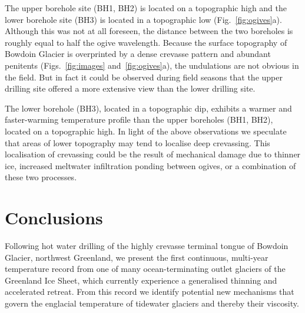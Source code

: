 \documentclass[utf8]{article}
\begin{document}
    The upper borehole site (BH1, BH2) is located on a topographic high and the
    lower borehole site (BH3) is located in a topographic low
    (Fig.~\ref{fig:ogives}a). Although this
    was not at all foreseen, the distance between the two boreholes is roughly
    equal to half the ogive wavelength. Because the surface topography of
    Bowdoin Glacier is overprinted by a dense crevasse pattern and abundant
    penitents (Figs.~\ref{fig:images} and~\ref{fig:ogives}a), the undulations
    are not obvious in the field. But in fact it
    could be observed during field seasons that the upper drilling site offered
    a more extensive view than the lower drilling site.

    The lower borehole (BH3), located in a topographic dip, exhibits a warmer
    and faster-warming temperature profile than the upper boreholes (BH1, BH2),
    located on a topographic high. In light of the above observations we
    speculate that areas of lower topography may tend to localise deep
    crevassing. This localisation of crevassing
    could be the result of mechanical damage due to thinner ice, increased
    meltwater infiltration ponding between ogives, or a combination of these
    two processes.


\section{Conclusions}

    Following hot water drilling of the highly crevasse terminal tongue of
    Bowdoin Glacier, northwest Greenland, we present the first continuous,
    multi-year temperature record from one of many ocean-terminating outlet
    glaciers of the Greenland Ice Sheet, which currently experience a
    generalised thinning and accelerated retreat. From this record we identify
    potential new mechanisms that govern the englacial temperature of tidewater
    glaciers and thereby their viscosity.
\end{document}
